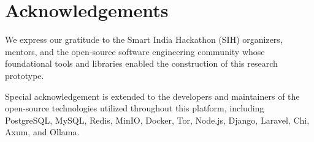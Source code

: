 \chapter*{Acknowledgements}
\label{ch:acknowledgements}

We express our gratitude to the Smart India Hackathon (SIH) organizers, mentors, and the open-source software engineering community whose foundational tools and libraries enabled the construction of this research prototype. 

Special acknowledgement is extended to the developers and maintainers of the open-source technologies utilized throughout this platform, including PostgreSQL, MySQL, Redis, MinIO, Docker, Tor, Node.js, Django, Laravel, Chi, Axum, and Ollama.
